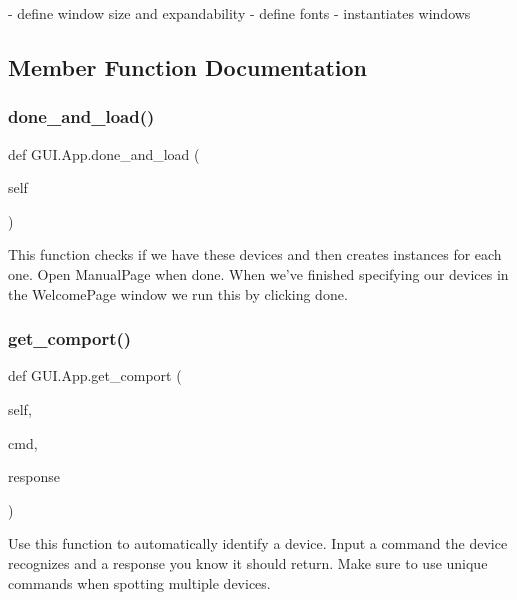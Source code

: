 \begin{DoxyVerb}- define window size and expandability
- define fonts
- instantiates windows
\end{DoxyVerb}
 

\subsection{Member Function Documentation}
\mbox{\label{class_g_u_i_1_1_app_aa208ca0794eea3fb8375a4ec249ee41e}} 
\subsubsection{\texorpdfstring{done\_and\_load()}{done\_and\_load()}}
{\footnotesize\ttfamily def G\+U\+I.\+App.\+done\+\_\+and\+\_\+load (\begin{DoxyParamCaption}\item[{}]{self }\end{DoxyParamCaption})}

\begin{DoxyVerb}This function checks if we have these devices and then creates instances for each one. Open ManualPage when done.
When we've finished specifying our devices in the WelcomePage window we run this by clicking done.
\end{DoxyVerb}
 \mbox{\label{class_g_u_i_1_1_app_af66528172d6a667ee5f2fba341a58bab}} 
\subsubsection{\texorpdfstring{get\_comport()}{get\_comport()}}
{\footnotesize\ttfamily def G\+U\+I.\+App.\+get\+\_\+comport (\begin{DoxyParamCaption}\item[{}]{self,  }\item[{}]{cmd,  }\item[{}]{response }\end{DoxyParamCaption})}

\begin{DoxyVerb}Use this function to automatically identify
a device. Input a command the device recognizes and a response you know
it should return. Make sure to use unique commands when spotting multiple devices.
\end{DoxyVerb}
 \mbox{\label{class_g_u_i_1_1_app_a87d24261fd2549666a3a2a35bbc593f1}} 
